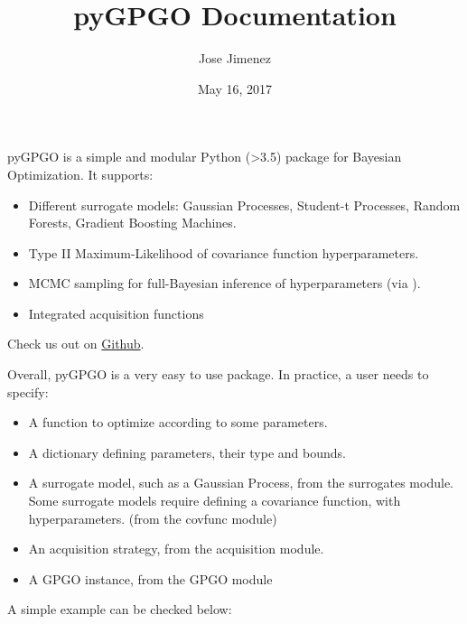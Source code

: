 \documentclass[letterpaper,10pt,english]{sphinxmanual}
\title{pyGPGO Documentation}
\date{May 16, 2017}
\author{Jose Jimenez}
\begin{document}
\maketitle
\tableofcontents
{}\label{index::doc}


pyGPGO is a simple and modular Python (\textgreater{}3.5) package for Bayesian Optimization. It supports:
\begin{itemize}
\item {} 
Different surrogate models: Gaussian Processes, Student-t Processes, Random Forests, Gradient Boosting Machines.

\item {} 
Type II Maximum-Likelihood of covariance function hyperparameters.

\item {} 
MCMC sampling for full-Bayesian inference of hyperparameters (via ).

\item {} 
Integrated acquisition functions

\end{itemize}

Check us out on  \href{https://github.com/hawk31/pyGPGO}{Github}.

Overall, pyGPGO is a very easy to use package. In practice, a user needs to specify:
\begin{itemize}
\item {} 
A function to optimize according to some parameters.

\item {} 
A dictionary defining parameters, their type and bounds.

\item {} 
A surrogate model, such as a Gaussian Process, from the surrogates module. Some surrogate models require defining
a covariance function, with hyperparameters. (from the covfunc module)

\item {} 
An acquisition strategy, from the acquisition module.

\item {} 
A GPGO instance, from the GPGO module

\end{itemize}

A simple example can be checked below:
\end{document}
